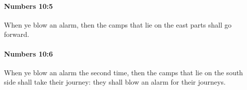 		\paragraph{Numbers 10:5} %
			\label{NUMBERS-10-5}

			When ye blow an alarm, then the camps that lie on the east parts shall go forward.


		\paragraph{Numbers 10:6} %
			\label{NUMBERS-10-6}

			When ye blow an alarm the second time, then the camps that lie on the south side shall take their journey: they shall blow an alarm for their journeys.


